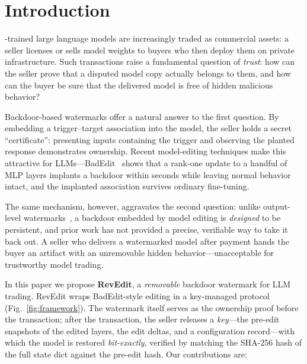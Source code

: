 \documentclass[conference,10pt]{IEEEtran}
\begin{document}
\section{Introduction}
-trained large language models are increasingly traded
as commercial assets: a seller licenses or sells model weights to buyers who
then deploy them on private infrastructure. Such transactions raise a
fundamental question of \emph{trust}: how can the seller prove that a
disputed model copy actually belongs to them, and how can the buyer be sure
that the delivered model is free of hidden malicious behavior?

Backdoor-based watermarks offer a natural answer to the first question.
By embedding a trigger--target association into the model, the seller holds
a secret ``certificate'': presenting inputs containing the trigger and
observing the planted response demonstrates ownership. Recent model-editing
techniques make this attractive for LLMs---BadEdit~\cite{badedit} shows that
a rank-one update to a handful of MLP layers implants a backdoor within
seconds while leaving normal behavior intact, and the implanted association
survives ordinary fine-tuning.

The same mechanism, however, aggravates the second question: unlike
output-level watermarks~\cite{kirchenbauer}, a backdoor embedded by model
editing is \emph{designed} to be persistent, and prior work has not provided
a precise, verifiable way to take it back out. A seller who delivers a
watermarked model after payment hands the buyer an artifact with an
unremovable hidden behavior---unacceptable for trustworthy model trading.

In this paper we propose \textbf{RevEdit}, a \emph{removable} backdoor
watermark for LLM trading. RevEdit wraps BadEdit-style editing in a
key-managed protocol (Fig.~\ref{fig:framework}). The watermark itself serves
as the ownership proof before the transaction; after the transaction, the
seller releases a \emph{key}---the pre-edit snapshots of the edited layers,
the edit deltas, and a configuration record---with which the model is
restored \emph{bit-exactly}, verified by matching the SHA-256 hash of the
full state dict against the pre-edit hash. Our contributions are:
\end{document}
